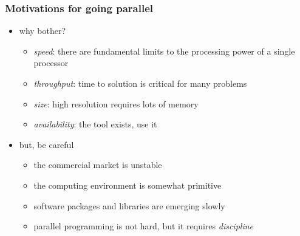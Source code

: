 %
%
%
%


\begin{frame}[fragile]
%
  \frametitle{Motivations for going parallel}
%
  \begin{itemize}
%
  \item why bother?
    \begin{itemize}
    \item {\em speed}: there are fundamental limits to the processing power of a single processor
    \item {\em throughput}: time to solution is critical for many problems
    \item {\em size}: high resolution requires lots of memory
    \item {\em availability}: the tool exists, use it
    \end{itemize}
%
  \item but, be careful
    \begin{itemize}
    \item the commercial market is unstable
    \item the computing environment is somewhat primitive
    \item software packages and libraries are emerging slowly
    \item parallel programming is not hard, but it requires {\em discipline}
    \end{itemize}
%
  \end{itemize}
%
\end{frame}

